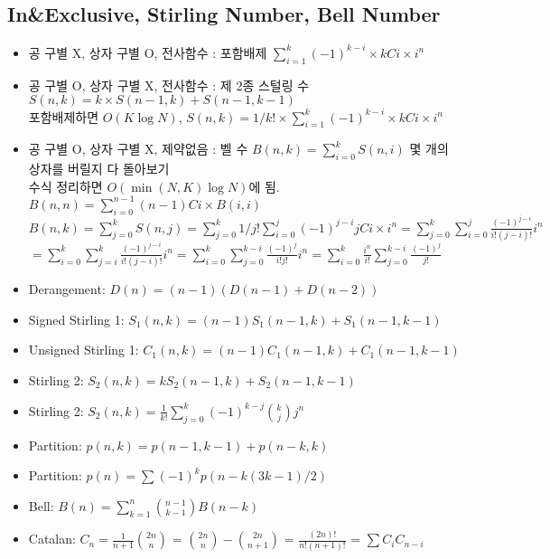 \documentclass[landscape, 8pt, a4paper, oneside]{extarticle}
\begin{document}
\begin{multicols*}{3}
\subsection{In\&Exclusive, Stirling Number, Bell Number}
\begin{itemize}[noitemsep]

\item 공 구별 X, 상자 구별 O, 전사함수 : 포함배제 $\sum_{i=1}^{k} (-1)^{k-i} \times kCi \times i^n$
\item 공 구별 O, 상자 구별 X, 전사함수 : 제 2종 스털링 수 $S(n,k)=k\times S(n-1,k) + S(n-1, k-1)$\\
포함배제하면 $O(K \log N)$, $S(n,k) = 1/k! \times \sum_{i=1}^{k} (-1)^{k-i} \times kCi \times i^n$
\item 공 구별 O, 상자 구별 X, 제약없음 : 벨 수 $B(n,k) = \sum_{i=0}^{k} S(n,i)$ 몇 개의 상자를 버릴지 다 돌아보기\\
수식 정리하면 $O(\min(N,K)\log N)$에 됨. $B(n,n) = \sum_{i=0}^{n-1} (n-1)Ci \times B(i,i)$\\
$B(n,k)=\sum_{j=0}^{k}S(n,j) = \sum_{j=0}^{k} 1/j! \sum_{i=0}^{j} (-1)^{j-i} jCi \times i^n=\sum_{j=0}^{k}\sum_{i=0}^{j} \frac{(-1)^{j-i}}{i!(j-i)!}i^n$\\
$=\sum_{i=0}^{k}\sum_{j=i}^{k}\frac{(-1)^{j-i}}{i!(j-i)!}i^n = \sum_{i=0}^{k}\sum_{j=0}^{k-i}\frac{(-1)^j}{i!j!}i^n = \sum_{i=0}^k \frac{i^n}{i!}\sum_{j=0}^{k-i} \frac{(-1)^j}{j!}$

\item Derangement: $D(n)=(n-1)(D(n-1)+D(n-2))$
\item Signed Stirling 1: $S_1(n,k)=(n-1)S_1(n-1,k)+S_1(n-1,k-1)$
\item Unsigned Stirling 1: $C_1(n,k)=(n-1)C_1(n-1,k)+C_1(n-1,k-1)$
\item Stirling 2: $S_2(n,k)=kS_2(n-1,k)+S_2(n-1,k-1)$
\item Stirling 2: $S_2(n,k)=\frac{1}{k!}\sum_{j=0}^{k} (-1)^{k-j}{k \choose j}j^n$
\item Partition: $p(n,k)=p(n-1,k-1) + p(n-k,k)$
\item Partition: $p(n)=\sum (-1)^kp(n-k(3k-1)/2)$
\item Bell: $B(n)=\sum_{k=1}^n {n-1\choose k-1}B(n-k)$
\item Catalan: $C_n=\frac{1}{n+1}{2n\choose n}$ = ${2n\choose n}-{2n\choose n+1}$ = $\frac{(2n)!}{n!(n+1)!}$ = $\sum C_iC_{n-i}$

\end{itemize}


\end{multicols*}
\end{document}
